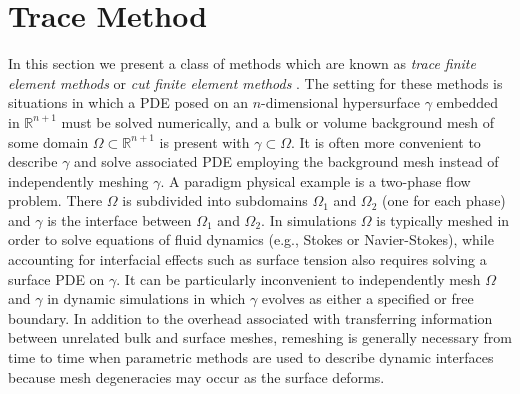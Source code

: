 
\section{Trace Method}\label{sec:trace}

In this section we present a class of methods which are known as {\it trace finite element methods} or {\it cut finite element methods} \cite{ORG09, BHL15, Re15}.  The setting for these methods is situations in which a PDE posed on an $n$-dimensional hypersurface $\gamma$ embedded in $\mathbb{R}^{n+1}$ must be solved numerically, and a bulk or volume background mesh of some domain $\Omega \subset \mathbb{R}^{n+1}$ is present with $\gamma \subset \Omega$.  It is often more convenient to describe $\gamma$ and solve associated PDE employing the background mesh instead of independently meshing $\gamma$.  A paradigm physical example is a two-phase flow problem.  There $\Omega$ is subdivided into subdomains $\Omega_1$ and $\Omega_2$ (one for each phase) and $\gamma$ is the interface between $\Omega_1$ and $\Omega_2$.  In simulations $\Omega$ is typically meshed in order to solve equations of fluid dynamics (e.g., Stokes or Navier-Stokes), while accounting for interfacial effects such as surface tension also requires solving a surface PDE on $\gamma$.  It can be particularly inconvenient to independently mesh $\Omega$ and $\gamma$ in dynamic simulations in which $\gamma$ evolves as either a specified or free boundary.   In addition to the overhead associated with transferring information between unrelated bulk and surface meshes,  remeshing is generally necessary from time to time when parametric methods are used to describe dynamic interfaces because mesh degeneracies may occur as the surface deforms.  


